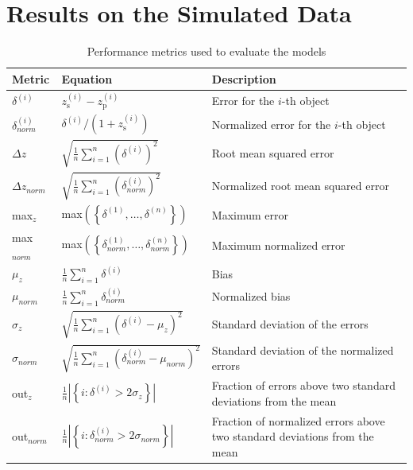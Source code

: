 \documentclass[useAMS,usenatbib,fleqn]{mn2e}
\begin{document}
\section{Results on the Simulated Data}
\label{sec-experiments}

 \begin{table}
 \caption{Performance metrics used to evaluate the models}
\begin{center}
  \begin{tabular}{| l | l | l |}
     	Metric				&	Equation	& Description\\	\hline
	$\delta^{(i)}$		&	$z_\textrm{s}^{(i)}-z_\textrm{p}^{(i)}	$		&  Error for the $i$-th object\\

	$\delta^{(i)}_{norm}$		&	$\delta^{(i)}/\left(1+z_\textrm{s}^{(i)}\right)$	&  Normalized error for the $i$-th object		\\

	$\Delta z$		&	$\sqrt{\frac{1}{n}\sum_{i=1}^{n}\left(\delta^{(i)}\right)^{2}}$	&  Root mean squared error		\\

	$\Delta z_{norm}$		&	$\sqrt{\frac{1}{n}\sum_{i=1}^{n}\left(\delta_{norm}^{(i)}\right)^{2}}$	&  Normalized root mean squared error		\\

	max$_{z}$	& max$\left(\left\{\delta^{(1)},\hdots,\delta^{(n)}\right\}\right)$& Maximum error \\
	
	max$_{norm}$	& max$\left(\left\{\delta_{norm}^{(1)},\hdots,\delta_{norm}^{(n)}\right\}\right)$& Maximum normalized error \\
	
	$\mu_{z}$		&	$\frac{1}{n}\sum_{i=1}^{n}\delta^{(i)}$	&  Bias		\\

	$\mu_{norm}$		&	$\frac{1}{n}\sum_{i=1}^{n}\delta_{norm}^{(i)}$	&  Normalized bias		\\

	$\sigma_{z}$		&	$\sqrt{\frac{1}{n}\sum_{i=1}^{n}\left(\delta^{(i)}-\mu_{z}\right)^{2}}$	&  Standard deviation of the errors		\\

	$\sigma_{norm}$		&	$\sqrt{\frac{1}{n}\sum_{i=1}^{n}\left(\delta_{norm}^{(i)}-\mu_{norm}\right)^{2}}$	&  Standard deviation of the normalized errors \\
	
	out$_{z}$		&	$\frac{1}{n}\left | \left\{i: \delta^{(i)}>2\sigma_{z}\right\}\right |$	&  Fraction of errors above two standard deviations from the mean \\
	out$_{norm}$		&	$\frac{1}{n}\left | \left\{i: \delta_{norm}^{(i)}>2\sigma_{norm}\right\}\right |$	&  Fraction of normalized errors above two standard deviations from the mean \\
	
  \end{tabular}
\end{center}
\label{table-metrics}
\end{table}
\end{document}
